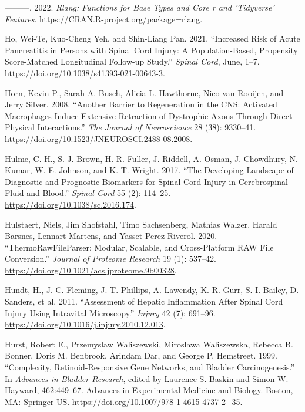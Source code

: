\documentclass[9pt,lineno]{elife}
\newlength{\cslhangindent}
\newlength{\cslentryspacingunit} %
\newenvironment{CSLReferences}[2] %
 {%
  \setlength{\parindent}{0pt}
  \ifodd #1
  \let\oldpar\par
  \def\par{\hangindent=\cslhangindent\oldpar}
  \fi
  \setlength{\parskip}{#2\cslentryspacingunit}
 }%
 {}
\begin{document}
\begin{CSLReferences}{1}{0}
\leavevmode{}%
---------. 2022. \emph{Rlang: Functions for Base Types and Core r and 'Tidyverse' Features}. \url{https://CRAN.R-project.org/package=rlang}.

\leavevmode{}%
Ho, Wei-Te, Kuo-Cheng Yeh, and Shin-Liang Pan. 2021. {``Increased Risk of Acute Pancreatitis in Persons with Spinal Cord Injury: A Population-Based, Propensity Score-Matched Longitudinal Follow-up Study.''} \emph{Spinal Cord}, June, 1--7. \url{https://doi.org/10.1038/s41393-021-00643-3}.

\leavevmode{}%
Horn, Kevin P., Sarah A. Busch, Alicia L. Hawthorne, Nico van Rooijen, and Jerry Silver. 2008. {``Another {Barrier} to {Regeneration} in the {CNS}: {Activated Macrophages Induce Extensive Retraction} of {Dystrophic Axons} Through {Direct Physical Interactions}.''} \emph{The Journal of Neuroscience} 28 (38): 9330--41. \url{https://doi.org/10.1523/JNEUROSCI.2488-08.2008}.

\leavevmode{}%
Hulme, C. H., S. J. Brown, H. R. Fuller, J. Riddell, A. Osman, J. Chowdhury, N. Kumar, W. E. Johnson, and K. T. Wright. 2017. {``The Developing Landscape of Diagnostic and Prognostic Biomarkers for Spinal Cord Injury in Cerebrospinal Fluid and Blood.''} \emph{Spinal Cord} 55 (2): 114--25. \url{https://doi.org/10.1038/sc.2016.174}.

\leavevmode{}%
Hulstaert, Niels, Jim Shofstahl, Timo Sachsenberg, Mathias Walzer, Harald Barsnes, Lennart Martens, and Yasset Perez-Riverol. 2020. {``{ThermoRawFileParser}: {Modular}, {Scalable}, and {Cross-Platform RAW File Conversion}.''} \emph{Journal of Proteome Research} 19 (1): 537--42. \url{https://doi.org/10.1021/acs.jproteome.9b00328}.

\leavevmode{}%
Hundt, H., J. C. Fleming, J. T. Phillips, A. Lawendy, K. R. Gurr, S. I. Bailey, D. Sanders, et al. 2011. {``Assessment of Hepatic Inflammation After Spinal Cord Injury Using Intravital Microscopy.''} \emph{Injury} 42 (7): 691--96. \url{https://doi.org/10.1016/j.injury.2010.12.013}.

\leavevmode{}%
Hurst, Robert E., Przemyslaw Waliszewski, Miroslawa Waliszewska, Rebecca B. Bonner, Doris M. Benbrook, Arindam Dar, and George P. Hemstreet. 1999. {``Complexity, {Retinoid-Responsive Gene Networks}, and {Bladder Carcinogenesis}.''} In \emph{Advances in {Bladder Research}}, edited by Laurence S. Baskin and Simon W. Hayward, 462:449--67. Advances in {Experimental Medicine} and {Biology}. {Boston, MA}: {Springer US}. \url{https://doi.org/10.1007/978-1-4615-4737-2_35}.


\end{CSLReferences}
\end{document}
